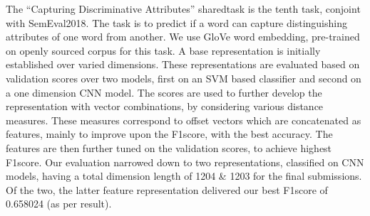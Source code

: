 The ``Capturing Discriminative Attributes'' sharedtask is the tenth task, conjoint with SemEval2018. The task is to predict if a word can capture distinguishing attributes of one word from another. We use GloVe word embedding, pre-trained on openly sourced corpus for this task. A base representation is initially established over varied dimensions. These representations are evaluated based on validation scores over two models, first on an SVM based classifier and second on a one dimension CNN model. The scores are used to further develop the representation with vector combinations, by considering various distance measures. These measures correspond to offset vectors which are concatenated as features, mainly to improve upon the F1score, with the best accuracy. The features are then further tuned on the validation scores, to achieve highest F1score. Our evaluation narrowed down to two representations, classified on CNN models, having a total dimension length of 1204 \& 1203 for the final submissions. Of the two, the latter feature representation delivered our best F1score of 0.658024 (as per result).
